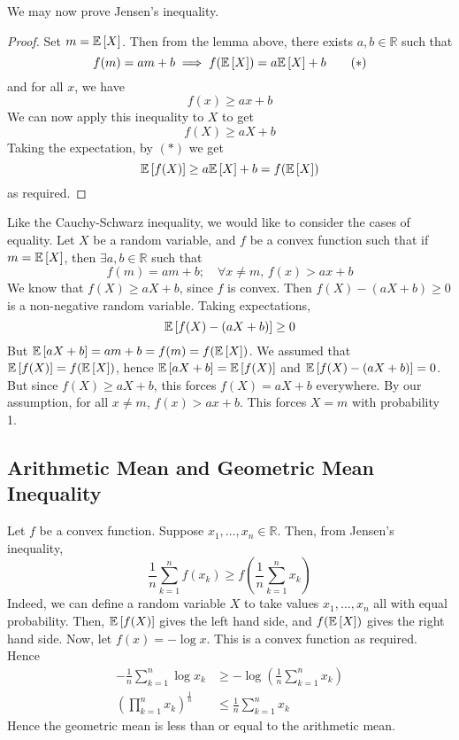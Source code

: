 \noindent We may now prove Jensen's inequality.
\begin{proof}
	Set \(m = \mathbb{E}\left[{X}\right]\). Then from the lemma above, there exists \(a, b \in \mathbb R\) such that
	\begin{equation}
		f(m) = am + b \implies f(\mathbb{E}\left[{X}\right]) = a\mathbb{E}\left[{X}\right] + b \tag{\(\ast\)}
	\end{equation}
	and for all \(x\), we have
	\[ f(x) \geq ax + b \]
	We can now apply this inequality to \(X\) to get
	\[ f(X) \geq aX + b \]
	Taking the expectation, by \((\ast)\) we get
	\[ \mathbb{E}\left[{f(X)}\right] \geq a\mathbb{E}\left[{X}\right] + b = f(\mathbb{E}\left[{X}\right]) \]
	as required.
\end{proof}
\noindent Like the Cauchy-Schwarz inequality, we would like to consider the cases of equality. Let \(X\) be a random variable, and \(f\) be a convex function such that if \(m = \mathbb{E}\left[{X}\right]\), then \(\exists a, b \in \mathbb R\) such that
\[ f(m) = am + b;\quad \forall x \neq m,\, f(x) > ax + b \]
We know that \(f(X) \geq aX + b\), since \(f\) is convex. Then \(f(X) - (aX+b) \geq 0\) is a non-negative random variable. Taking expectations,
\[ \mathbb{E}\left[{f(X) - (aX+b)}\right] \geq 0 \]
But \(\mathbb{E}\left[{aX + b}\right] = am + b = f(m) = f(\mathbb{E}\left[{X}\right])\). We assumed that \(\mathbb{E}\left[{f(X)}\right] = f(\mathbb{E}\left[{X}\right])\), hence \(\mathbb{E}\left[{aX+b}\right] = \mathbb{E}\left[{f(X)}\right]\) and \(\mathbb{E}\left[{f(X) - (aX+b)}\right] = 0\). But since \(f(X) \geq aX+b\), this forces \(f(X) = aX+b\) everywhere. By our assumption, for all \(x \neq m\), \(f(x) > ax+b\). This forces \(X=m\) with probability 1.

\subsection{Arithmetic Mean and Geometric Mean Inequality}
Let \(f\) be a convex function. Suppose \(x_1, \dots, x_n \in \mathbb R\). Then, from Jensen's inequality,
\[ \frac{1}{n} \sum_{k=1}^n f(x_k) \geq f\left( \frac{1}{n} \sum_{k=1}^n x_k \right) \]
Indeed, we can define a random variable \(X\) to take values \(x_1, \dots, x_n\) all with equal probability. Then, \(\mathbb{E}\left[{f(X)}\right]\) gives the left hand side, and \(f(\mathbb{E}\left[{X}\right])\) gives the right hand side. Now, let \(f(x) = -\log x\). This is a convex function as required. Hence
\begin{align*}
	-\frac{1}{n} \sum_{k=1}^n \log x_k             & \geq -\log\left( \frac{1}{n} \sum_{k=1}^n x_k \right) \\
	\left( \prod_{k=1}^n x_k \right)^{\frac{1}{n}} & \leq \frac{1}{n} \sum_{k=1}^n x_k
\end{align*}
Hence the geometric mean is less than or equal to the arithmetic mean.

